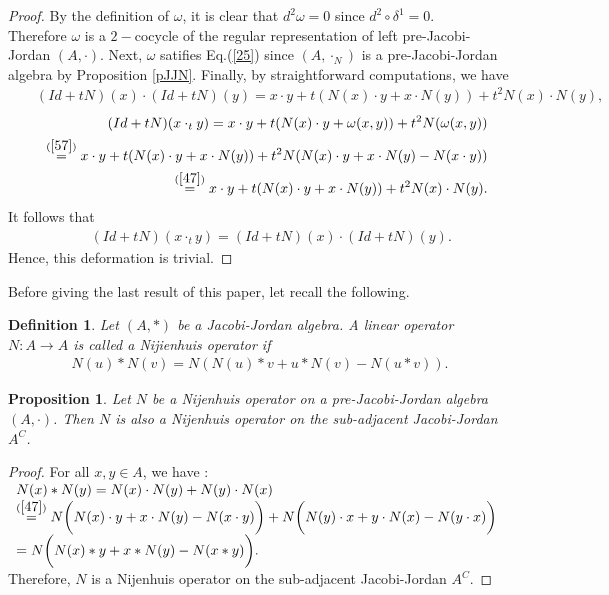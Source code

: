 \documentclass[12pt]{amsart}
\newtheorem{definition}[Theorem]{Definition}
\newtheorem{proposition}[Theorem]{Proposition}
\begin{document}
	\begin{proof}
		By the definition of $\omega$, it is clear that $d^2\omega=0$ since $d^2\circ \delta^1=0.$\\
		Therefore $ \omega $ is a $ 2- $cocycle of the regular representation of left pre-Jacobi-Jordan $ (A,\cdot)$.
		Next,  $\omega$ satifies Eq.(\ref{25}) since $(A,\cdot_N)$ is a pre-Jacobi-Jordan algebra by Proposition \ref{pJJN}. Finally, by straightforward computations, we have
		\begin{eqnarray}
			&&(Id+tN)(x)\cdot (Id+tN)(y)=x\cdot y+t(N(x)\cdot y+x\cdot N(y))+t^2 N(x)\cdot N(y),\nonumber
		\end{eqnarray}	
		\begin{eqnarray}
			&&(Id+tN)(x\cdot_{t}y)=x\cdot y+t(N(x)\cdot y+\omega(x,y))+t^2N(\omega(x,y))\nonumber\\
			&&	\overset{(\ref{57})}{=} x\cdot y+t(N(x)\cdot y+x\cdot N(y))+t^2N(N(x)\cdot y+x\cdot N(y)-N(x\cdot y))\nonumber\\
			&&
			\overset{(\ref{47})}{=} x\cdot y+t(N(x)\cdot y+x\cdot N(y))+t^2N(x)\cdot N(y).\nonumber
		\end{eqnarray}	
		It follows that
		\begin{eqnarray}
			&&(Id+tN)(x\cdot_{t}y)=(Id+tN)(x)\cdot (Id+tN)(y).\nonumber
		\end{eqnarray}
		Hence, this deformation is trivial.	
	\end{proof}	
Before giving the last result of this paper, let recall the following.
\begin{definition}
	Let $(A, \ast)$ be a Jacobi-Jordan algebra.
	A linear operator $N: A\rightarrow A$ is called a Nijienhuis operator if
	\begin{eqnarray}
		N(u)\ast N(v)=N(N(u)\ast v+u\ast N(v)-N(u\ast v)). \label{opn}
	\end{eqnarray}
\end{definition}
	\begin{proposition}\label{Pro10}
		Let $ N $ be a Nijenhuis operator on a pre-Jacobi-Jordan algebra $ (A,\cdot) $. Then $ N $ is also a Nijenhuis operator on the sub-adjacent Jacobi-Jordan $ A^{C} $.
	\end{proposition}
	\begin{proof}
		For all $ x,y\in A $, we have : \\
		$ \begin{array}{lll}
			N(x)\ast N(y)=N(x)\cdot N(y)+N(y)\cdot N(x)\\
			\overset{(\ref{47})}{=}N\bigg(N(x)\cdot y+x\cdot N(y)-N(x\cdot y)\bigg)+N\bigg(N(y)\cdot x+y\cdot N(x)-N(y\cdot x)\bigg)\\
			=N\bigg(N(x)\ast y+x\ast N(y)-N(x\ast y)\bigg).
		\end{array}
		$\\
		Therefore, $ N $ is a Nijenhuis operator on the sub-adjacent Jacobi-Jordan $ A^{C} $. 
	\end{proof}
\end{document}
